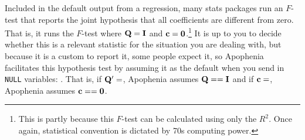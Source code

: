Included in the default output from a regression,
many stats packages run an $F$-test that reports the
joint hypothesis that all coefficients are different from zero. That is,
it runs the $F$-test where ${\bf Q} = {\bf I}$ and ${\bf c} = {\bf 0}$.\footnote{This is
partly because this $F$-test can be calculated using only the $R^2$.
Once again, statistical convention is dictated by 70s computing power.
}
It is up to you
to decide whether this is a relevant statistic for the situation you are
dealing with, but because it is a custom to report it, some
people expect it, so Apophenia facilitates this hypothesis test by
assuming it as the default when you send in {\tt NULL} variables:
. That is,
if ${\bf Q}'=$, Apophenia assumes ${\bf Q}=={\bf I}$ and if
${\bf c}=$, Apophenia assumes ${\bf c} == {\bf 0}$.





